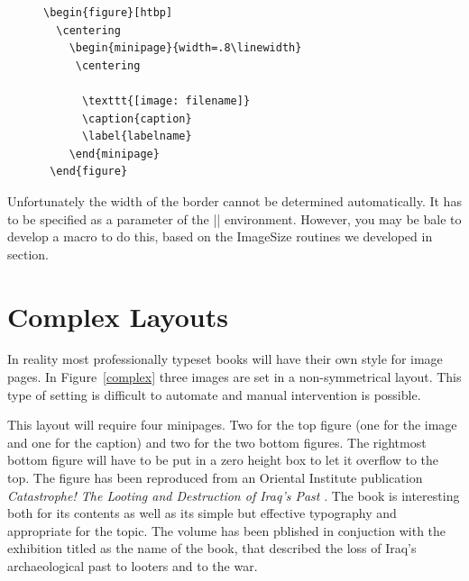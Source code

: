 \begin{figure}[htbp]
\begin{commands}[]{}
\centering
 
\begin{verbatim}
\begin{figure}[htbp]
  \centering
    \begin{minipage}{width=.8\linewidth}
     \centering
     
      \texttt{[image: filename]}
      \caption{caption}
      \label{labelname}
    \end{minipage}
 \end{figure}
\end{verbatim}
\end{commands}
\end{figure}



Unfortunately the width of the border cannot be determined automatically. It has to be specified as a parameter of the |\minipage| environment. However, you may be bale to develop a macro to do this,  based on the ImageSize routines we developed in section.


\section{Complex Layouts}
\label{looting}
In reality most professionally typeset books will have their own style for image pages. In Figure~\ref{complex}
three images are set in a non-symmetrical layout. This type of setting is difficult to automate and manual intervention is possible.

This layout will require four minipages. Two for the top figure (one for the image and one for the caption) and two for the two bottom figures. The rightmost bottom figure will have to be put in a zero height box to let it overflow to the top. The figure has been reproduced from an Oriental Institute publication \emph{Catastrophe! The Looting and Destruction of Iraq’s Past} \cite{looting}. The book is interesting both for its contents as well as its simple but effective typography and appropriate for the topic. The volume has been pblished in conjuction with the exhibition titled as the name of the book, that described the loss of Iraq’s archaeological past to looters and to the war. 

